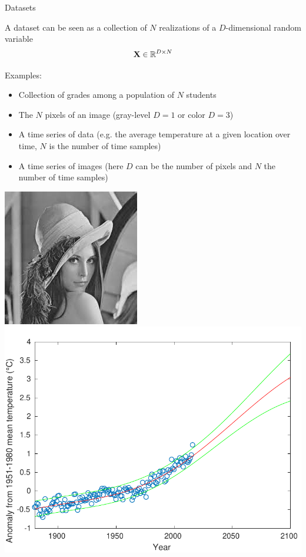 \documentclass{beamer}
\begin{document}
\begin{frame}{Datasets}

A dataset can be seen as a collection of $N$ realizations of a $D$-dimensional random variable
\begin{equation*}
\mathbf{X} \in \mathbb{R}^{D\times N}
\vspace{-0.2cm}
\end{equation*}

Examples:
\begin{itemize}
\item Collection of grades among a population of $N$ students
\item The $N$ pixels of an image (gray-level $D=1$ or color $D = 3$)
\item A time series of data (e.g. the average temperature at a given location over time, $N$ is the number of time samples)
\item A time series of images (here $D$ can be the number of pixels and $N$ the number of time samples)
\end{itemize}
\vspace{-0.2cm}
\begin{center}
\includegraphics[scale=0.4]{lena.jpg} \hspace{0.2cm}
\includegraphics[scale=0.35]{gp_regression_nasa.pdf}

\end{center}

\end{frame}
\end{document}
